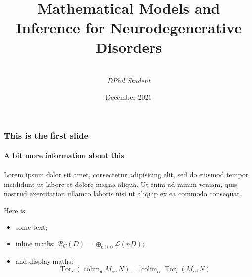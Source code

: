 \documentclass{beamer}
\title[Viva Presentation]{Mathematical Models and Inference for Neurodegenerative Disorders} %
\author%
{%
    \sc{Pavan Chaggar}\\
    \textit{DPhil Student}
}
\institute%
{%
    \textit{Mathematical Institute}\\
    \textit{University of Oxford}
}
\date[PoM2015]{December 2020} %
\begin{document}
    \begin{frame}[plain]
        \titlepage
    \end{frame}
    \begin{frame}
        \frametitle{This is the first slide}
        \framesubtitle{A bit more information about this}
        
        Lorem ipsum dolor sit amet, consectetur adipisicing elit, sed do eiusmod
        tempor incididunt ut labore et dolore magna aliqua. Ut enim ad minim veniam,
        quis nostrud exercitation ullamco laboris nisi ut aliquip ex ea commodo
        consequat.

        Here is
        \begin{itemize}
            \item some text;
            \item inline maths: $\mathcal{R}_C(D)=\oplus_{n\geqslant0}\mathcal{L}(nD)$;
            \item and display maths:
            \[
                \operatorname{Tor}_i(\operatorname{colim}_\alpha M_\alpha, N)
                = \operatorname{colim}_\alpha\operatorname{Tor}_i(M_\alpha,N)
            \]
        \end{itemize}

    \end{frame}
\end{document}
